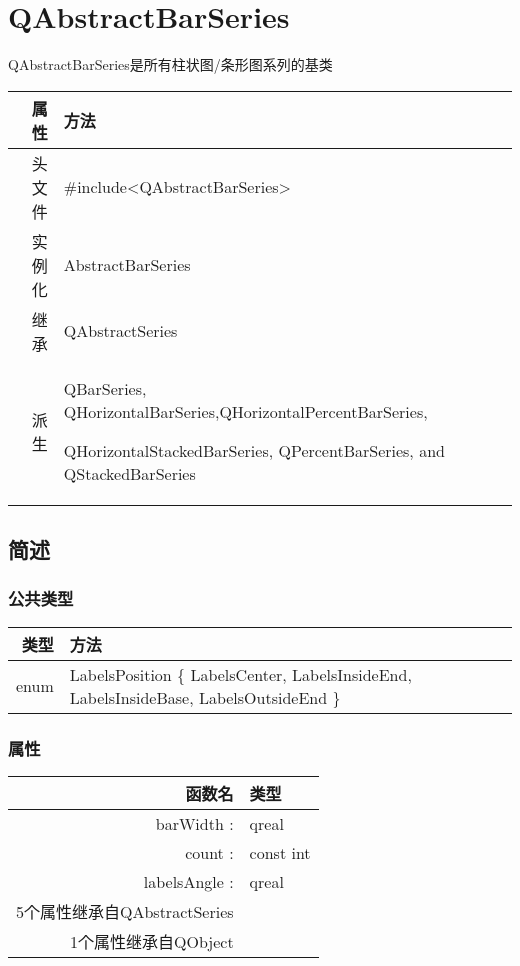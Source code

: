 \chapter{QAbstractBarSeries}

QAbstractBarSeries是所有柱状图/条形图系列的基类

\begin{tabular}{|r|m{25em}|}
	\hline
	属性 & 方法 \\
	\hline
	头文件 & \#include<QAbstractBarSeries>\\      
	\hline
	实例化 & AbstractBarSeries\\      
	\hline
	继承&QAbstractSeries \\
	\hline
	派生 & QBarSeries, QHorizontalBarSeries,QHorizontalPercentBarSeries,

 QHorizontalStackedBarSeries, QPercentBarSeries, and QStackedBarSeries \\
	\hline
\end{tabular}

\splitLine

\section{简述}

\subsection{公共类型}

\begin{tabular}{|r|m{20em}|}
\hline
类型 & 方法 \\
\hline
enum&	LabelsPosition \{ LabelsCenter, LabelsInsideEnd, LabelsInsideBase, LabelsOutsideEnd \}\\
\hline
\end{tabular}

\subsection{属性}

\begin{tabular}{|r|l|}
\hline
函数名 & 类型 \\
\hline
barWidth :	&qreal\\
\hline
count :	&const int\\
\hline
labelsAngle :&qreal\\
\hline
5个属性继承自QAbstractSeries &	\\
\hline
1个属性继承自QObject	&\\
\hline
\end{tabular}

